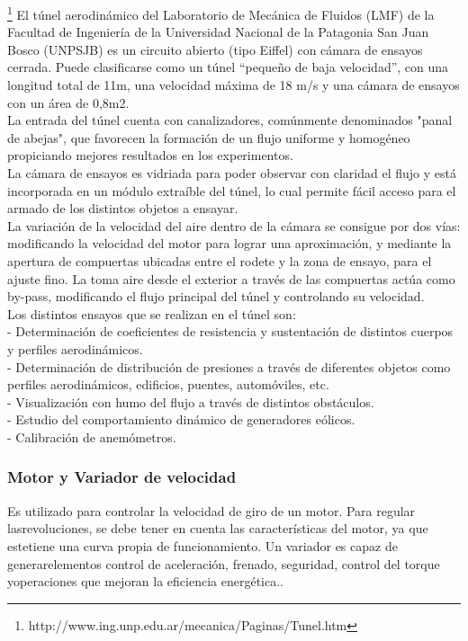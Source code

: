 \footnote{http://www.ing.unp.edu.ar/mecanica/Paginas/Tunel.htm} 
	El túnel aerodinámico del Laboratorio de Mecánica de Fluidos (LMF) de la Facultad de Ingeniería de la Universidad Nacional de la Patagonia San Juan Bosco (UNPSJB) es un circuito abierto (tipo Eiffel) con cámara de ensayos cerrada. Puede clasificarse como un túnel “pequeño de baja velocidad”, con una longitud total de 11m, una velocidad máxima de 18 m/s y una cámara de ensayos con un área de 0,8m2.
	\\
	La entrada del túnel cuenta con canalizadores, comúnmente denominados "panal de abejas", que favorecen la formación de un flujo uniforme y homogéneo propiciando mejores resultados en los experimentos.
	\\
	La cámara de ensayos es vidriada para poder observar con claridad el flujo y está incorporada en un módulo extraíble del túnel, lo cual permite fácil acceso para el armado de los distintos objetos a ensayar.
	\\
	La variación de la velocidad del aire dentro de la cámara se consigue por dos vías: modificando la velocidad del motor para lograr una aproximación, y mediante la apertura de compuertas ubicadas entre el rodete y la zona de ensayo, para el ajuste fino. La toma aire desde el exterior a través de las compuertas actúa como by-pass, modificando el flujo principal del túnel y controlando su velocidad.
	\\
	Los distintos ensayos que se realizan en el túnel son:
	\\
	- Determinación de coeficientes de resistencia y sustentación de distintos cuerpos y perfiles aerodinámicos. \\
	- Determinación de distribución de presiones a través de diferentes objetos como perfiles aerodinámicos, edificios, puentes, automóviles, etc. \\
	- Visualización con humo del flujo a través de distintos obstáculos. \\
	- Estudio del comportamiento dinámico de generadores eólicos. \\
	- Calibración de anemómetros. 
	\\
		\subsubsection{Motor y Variador de velocidad}
		\begin{tcolorbox}[colback=blue!5!white,colframe=blue!75!black,title=Variador de velocidad]
			Es utilizado para controlar la velocidad de giro de un motor. Para regular lasrevoluciones, se debe tener en cuenta las características del motor, ya que estetiene  una  curva  propia  de  funcionamiento.  Un  variador  es  capaz  de  generarelementos  control  de  aceleración,  frenado,  seguridad,  control  del  torque  yoperaciones que mejoran la eficiencia energética..\end{tcolorbox}	

